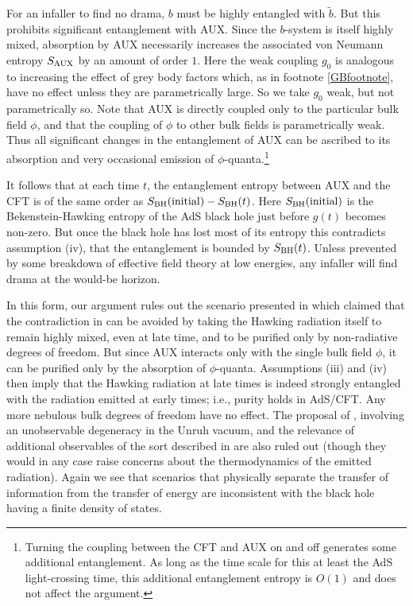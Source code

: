 \documentclass[12pt]{article}
\begin{document}
{{For an infaller to find no drama, $b$ must be highly entangled with $\tilde b$.   But this prohibits significant entanglement with AUX.  Since the $b$-system is itself highly mixed, absorption by AUX necessarily increases the associated von Neumann entropy $S_{\rm AUX}$ by an amount of order $1$.  Here the weak coupling $g_0$ is analogous to increasing the effect of grey body factors which, as in footnote \ref{GBfootnote}, have no effect unless they are parametrically large.  So we take $g_0$ weak, but not parametrically so.  Note that AUX is directly coupled only to the particular bulk field $\phi$, and that the coupling of $\phi$ to other bulk fields is parametrically weak.  Thus all significant changes in the entanglement of AUX can be ascribed to its absorption and very occasional emission of $\phi$-quanta.\footnote{Turning the coupling between the CFT and AUX on and off generates some additional entanglement.  As long as the time scale for this at least the AdS light-crossing time, this additional entanglement entropy is $O(1)$ and does not affect the argument.}


It follows that at each time $t$, %
{the entanglement entropy between AUX and the CFT}
 is of the same order as $S_{\rm BH}({\rm initial}) - S_{\rm BH}(t)$.  Here $S_{\rm BH}({\rm initial})$ is the Bekenstein-Hawking entropy of the AdS black hole just before $g(t)$ becomes non-zero.   But once the black hole has lost most of its entropy this contradicts assumption (iv), that the entanglement is bounded by $S_{\rm BH}(t)$.  Unless prevented by some breakdown of effective field theory at low energies, any infaller will find drama at the would-be horizon.

In this form, our argument rules out the scenario presented in \cite{Jacobson:2012gh} which claimed that the contradiction in \cite{Almheiri:2012rt} can be avoided by taking the Hawking radiation itself to remain highly mixed, even at late time, and to be purified only by non-radiative degrees of freedom. But since AUX interacts only with the single bulk field $\phi$, it can be purified only by the absorption of $\phi$-quanta.  Assumptions (iii) and (iv) then imply that the Hawking radiation at late times is indeed strongly entangled with the radiation emitted at early times; i.e., purity holds in AdS/CFT.   Any more nebulous bulk degrees of freedom have no effect.  The proposal of \cite{Hossenfelder:2012mr}, involving an unobservable degeneracy in the Unruh vacuum, and the relevance of additional observables of the sort described in \cite{Gambini:2013ooa} are also ruled out (though they would in any case  raise concerns about the thermodynamics of the emitted radiation). Again we see that scenarios that physically separate the transfer of information from the transfer of energy are inconsistent with the black hole having a finite density of states.


}}
\end{document}
